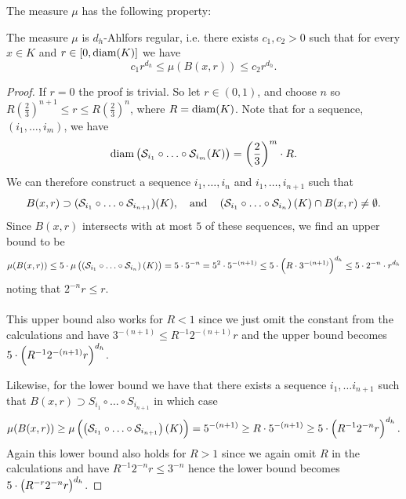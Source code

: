 The measure $\mu$ has the following property: 
\begin{prop}\label{normalziedHausdorffMeasureAhlforsRegular}
	The measure $\mu$ is $d_h$-Ahlfors regular, i.e. there exists $c_1, c_2 > 0$ such that for every $x \in K$ and $r \in [0, \operatorname{diam}(K)]$ we have
	\begin{equation}
		c_1r^{d_h} \leq \mu(B(x,r)) \leq c_2 r^{d_h}.
	\end{equation}
\end{prop}
\begin{proof}
	If $r = 0$ the proof is trivial. So let $r \in (0, 1)$, and choose $n$ so $R \left(\frac{2}{3}\right)^{n+1} \! \leq r \leq R \left(\frac{2}{3}\right)^{n}$, where $R = \operatorname{diam}(K)$. Note that for a sequence, $(i_1, \ldots, i_m)$, we have 
	\begin{equation}
		\operatorname{diam}\left(\mathcal{S}_{i_1} \circ \ldots \circ \mathcal{S}_{i_{m}}(K)\right) =  \left(\frac{2}{3}\right)^{m}\cdot R.
	\end{equation} 
	We can therefore construct a sequence $i_1, \ldots, i_n$ and $i_1, \ldots, i_{n+1}$ such that 
	\begin{equation}
		B(x,r)\supset (\mathcal{S}_{i_1} \circ \ldots \circ \mathcal{S}_{i_{n+1}})(K), \quad \text{and} \quad \left(\mathcal{S}_{i_1} \circ \ldots \circ \mathcal{S}_{i_{n}}\right)(K) \cap B(x,r) \neq \emptyset.
	\end{equation}
	Since $B(x,r)$ intersects with at most $5$ of these sequences, we find an upper bound to be
	\begin{equation}
		\mu(B(x,r)) \leq 5\cdot \mu\left( \left(\mathcal{S}_{i_1} \circ \ldots \circ \mathcal{S}_{i_n}\right)(K)\right) = 5\cdot 5^{-n}= 5^2\cdot5 ^{-(n+1)} \leq 5 \cdot \left(R\cdot 3^{-(n+1)}\right)^{d_h} \leq 5\cdot 2^{-n} \cdot r^{d_h}
	\end{equation} 
	noting that $2^{-n}r \leq r$. \\  \\
	This upper bound also works for $R < 1$ since we just omit the constant from the calculations and have $3^{-(n+1)} \leq R^{-1}2^{-(n+1)}r$ and the upper bound becomes $5\cdot \left(R^{-1} 2^{-(n+1)} r\right)^{d_h}$. 
	
	Likewise, for the lower bound we have that there exists a sequence $i_1, \ldots i_{n+1}$ such that $B(x,r)\supset S_{i_1} \circ \ldots \circ S_{i_{n+1}}$ in which case
	\begin{equation}
		\mu(B(x,r)) \geq \mu \left(\left(\mathcal{S}_{i_1} \circ \ldots \circ \mathcal{S}_{i_{n+1}}\right)(K)\right) = 5^{-(n+1)} \geq R\cdot 5^{-(n+1)} \geq  5\cdot \left(R^{-1}2^{-n}r\right)^{d_h}.
	\end{equation}
	Again this lower bound also holds for $R >1$ since we again omit $R$ in the calculations and have $R^{-1} 2^{-n} r \leq 3^{-n}$ hence the lower bound becomes $5 \cdot \left(R^{-r}2^{-n}r\right)^{d_h}$.
	

\end{proof}
